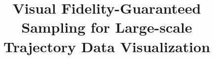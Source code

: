 \documentclass[conference]{IEEEtran}
\begin{document}
\title{Visual Fidelity-Guaranteed Sampling for Large-scale Trajectory Data Visualization
}

\author{
\and
{}

}

\maketitle

\newtheorem{problem}{Problem}
\newtheorem{lemma}{Lemma}
\newtheorem{theorem}{Theorem}
\newcommand{\Bo}[1]{{\color{red} Bo: #1}}
\newcommand{\QM}[1]{{\color{blue}{#1}}}

\newcommand{\D}{\mathcal{T}}
\newcommand{\V}{\mathsf{V}}
\newcommand{\oR}{\mathcal{R}}
\newcommand{\MU}{\mathsf{U}}
\newcommand{\vats}{\mathsf{VFGS}}
\newcommand{\rand}{\mathsf{RAND}}
\newcommand{\full}{\mathsf{FULL}}
\newcommand{\avats}{\mathsf{VFGS}^{+}}
\newcommand{\cavats}{\mathsf{VFGS}^{+}\mathsf{CE}}
\newcommand{\sz}{\textsf{Shenzhen}}
\newcommand{\pt}{\textsf{Porto}}
\newcommand{\trim}{\vspace{-2mm}}

\newcommand{\stitle}[1]{\vspace*{0.4em}\noindent{\bf #1:\/}}
\newcommand{\sstitle}[1]{\vspace*{0.4em}\noindent{\bf #1\/.}}


\newcommand{\squishlist}{
	\begin{list}{$\bullet$}
		{ \setlength{\itemsep}{0pt}
			\setlength{\parsep}{3pt}
			\setlength{\topsep}{3pt}
			\setlength{\partopsep}{0pt}
			\setlength{\leftmargin}{1.2em}
			\setlength{\labelwidth}{1em}
			\setlength{\labelsep}{0.6em}
		}
	}
	\newcommand{\squishend}{
	\end{list}
}

\end{document}
